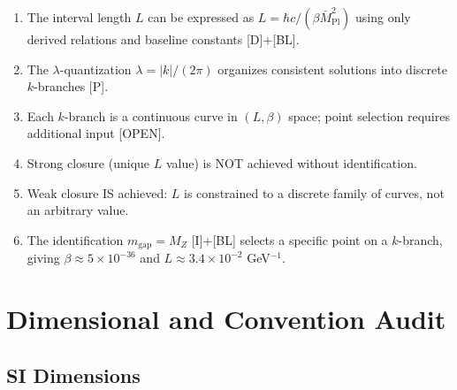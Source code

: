 \documentclass[11pt,a4paper]{article}
\begin{document}
\begin{enumerate}
  \item The interval length $L$ can be expressed as $L = \hbar c / (\beta \bar{M}_{\text{Pl}}^2)$
        using only derived relations and baseline constants [D]+[BL].

  \item The $\lambda$-quantization $\lambda = |k|/(2\pi)$ organizes consistent
        solutions into discrete $k$-branches [P].

  \item Each $k$-branch is a continuous curve in $(L, \beta)$ space; point
        selection requires additional input [OPEN].

  \item Strong closure (unique $L$ value) is NOT achieved without identification.

  \item Weak closure IS achieved: $L$ is constrained to a discrete family of
        curves, not an arbitrary value.

  \item The identification $m_{\text{gap}} = M_Z$ [I]+[BL] selects a specific
        point on a $k$-branch, giving $\beta \approx 5 \times 10^{-36}$ and
        $L \approx 3.4 \times 10^{-2}$ GeV$^{-1}$.
\end{enumerate}

\appendix

\section{Dimensional and Convention Audit}
\label{app:dimensions}

\subsection{SI Dimensions}
\end{document}
